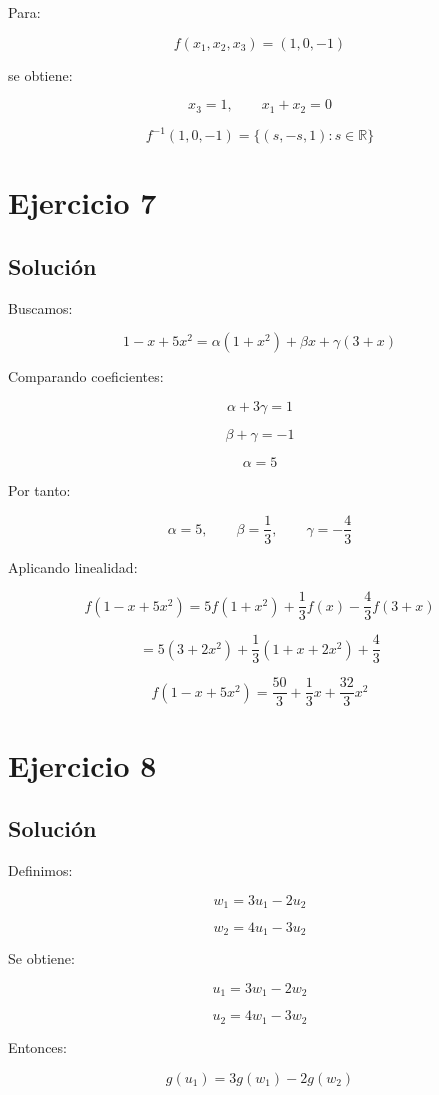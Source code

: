 \documentclass[11pt,a4paper]{article}
\newcommand{\R}{\mathbb{R}}
\begin{document}
	Para:

	\[
	f(x_1,x_2,x_3)=(1,0,-1)
	\]

	se obtiene:

	\[
	x_3=1,
	\qquad
	x_1+x_2=0
	\]

	\[
	\boxed{
	f^{-1}(1,0,-1)
	=
	\{(s,-s,1):s\in\R\}
	}
	\]

\section{Ejercicio 7}
	\subsection{Solución}

	Buscamos:

	\[
	1-x+5x^2
	=
	\alpha(1+x^2)+\beta x+\gamma(3+x)
	\]

	Comparando coeficientes:

	\[
	\alpha+3\gamma=1
	\]

	\[
	\beta+\gamma=-1
	\]

	\[
	\alpha=5
	\]

	Por tanto:

	\[
	\alpha=5,
	\qquad
	\beta=\frac13,
	\qquad
	\gamma=-\frac43
	\]

	Aplicando linealidad:

	\[
	f(1-x+5x^2)
	=
	5f(1+x^2)
	+
	\frac13f(x)
	-
	\frac43f(3+x)
	\]

	\[
	=
	5(3+2x^2)
	+
	\frac13(1+x+2x^2)
	+
	\frac43
	\]

	\[
	\boxed{
	f(1-x+5x^2)
	=
	\frac{50}{3}
	+
	\frac13x
	+
	\frac{32}{3}x^2
	}
	\]

\section{Ejercicio 8}
	\subsection{Solución}

	Definimos:

	\[
	w_1=3u_1-2u_2
	\]

	\[
	w_2=4u_1-3u_2
	\]

	Se obtiene:

	\[
	u_1=3w_1-2w_2
	\]

	\[
	u_2=4w_1-3w_2
	\]

	Entonces:

	\[
	g(u_1)
	=
	3g(w_1)-2g(w_2)
	\]
\end{document}

